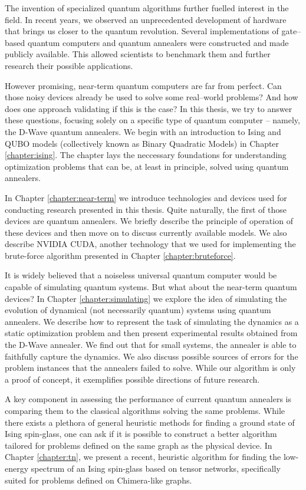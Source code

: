 The invention of specialized quantum algorithms further fuelled interest in the field. In recent years, we observed an unprecedented development of hardware that brings us closer to the quantum revolution. Several implementations of gate--based quantum computers \cite{ionq, bohnet} and quantum annealers \cite{johnson, dattani} were constructed and made publicly available. This allowed scientists to benchmark them and further research their possible applications.

However promising, near-term quantum computers are far from perfect. Can those noisy devices
already be used to solve some real--world problems? And how does one approach validating if this is
the case? In this thesis, we try to answer these questions, focusing solely on a specific type of
quantum computer -- namely, the D-Wave quantum annealers. We begin with an introduction to Ising and QUBO models (collectively known as Binary Quadratic Models)
in Chapter \ref{chapter:ising}. The chapter lays the neccessary foundations for understanding optimization problems
that can be, at least in principle, solved using quantum annealers.

In Chapter \ref{chapter:near-term} we introduce technologies and devices used for conducting research
presented in this thesis. Quite naturally, the first of those devices are quantum annealers. We briefly
describe the principle of operation of these devices and then move on to discuss currently available models.
We also describe NVIDIA CUDA, another technology that we used for implementing the brute-force algorithm presented in Chapter \ref{chapter:bruteforce}.

It is widely believed that a noiseless universal quantum computer would be capable of simulating quantum systems.
But what about the near-term quantum devices? In Chapter \ref{chapter:simulating} we explore the idea of simulating the evolution of dynamical (not necessarily quantum) systems using quantum annealers.
We describe how to represent the task of simulating the dynamics as a static optimization problem and then
present experimental results obtained from the D-Wave annealer. We find out that for small systems, the annealer
is able to faithfully capture the dynamics. We also discuss possible sources of errors for the problem instances
that the annealers failed to solve. While our algorithm is only a proof of concept, it exemplifies possible directions of future research.

A key component in assessing the performance of current quantum annealers is comparing them to the
classical algorithms solving the same problems. While there exists a plethora of general heuristic
methods for finding a ground state of Ising spin-glass, one can ask if it is possible to construct
a better algorithm tailored for problems defined on the same graph as the physical device.
In Chapter \ref{chapter:tn}, we present a recent, heuristic algorithm for finding the low-energy
spectrum of an Ising spin-glass based on tensor networks, specifically suited for problems defined
on Chimera-like graphs.

